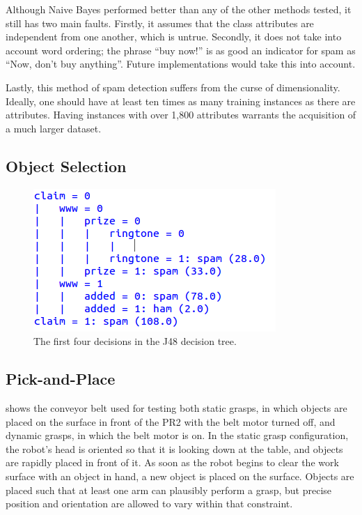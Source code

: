 \documentclass[letterpaper, 10 pt, conference]{ieeeconf}  %
\begin{document}
Although Naive Bayes performed better than any of the other methods
tested, it still has two main faults. Firstly, it assumes that the
class attributes are independent from one another, which is
untrue. Secondly, it does not take into account word ordering; the
phrase ``buy now!'' is as good an indicator for spam as ``Now, don't
buy anything''. Future implementations would take this into account.

Lastly, this method of spam detection suffers from the curse of
dimensionality. Ideally, one should have at least ten times as many
training instances as there are attributes. Having instances with over
1,800 attributes warrants the acquisition of a much larger dataset.

\subsection{Object Selection}
\begin{figure}[t]
\centering
\includegraphics[width=0.8\columnwidth]{figures/J48.png}
\caption{
The first four decisions in the J48 decision tree.
}
\end{figure}
 

\subsection{Pick-and-Place} 
 shows the conveyor belt used for testing
both static grasps, in which objects are placed on the surface in
front of the PR2 with the belt motor turned off, and dynamic grasps,
in which the belt motor is on. In the static grasp configuration, the
robot's head is oriented so that it is looking down at the table, and
objects are rapidly placed in front of it. As soon as the robot begins
to clear the work surface with an object in hand, a new object is
placed on the surface. Objects are placed such that at least one arm
can plausibly perform a grasp, but precise position and orientation
are allowed to vary within that constraint.
\end{document}
